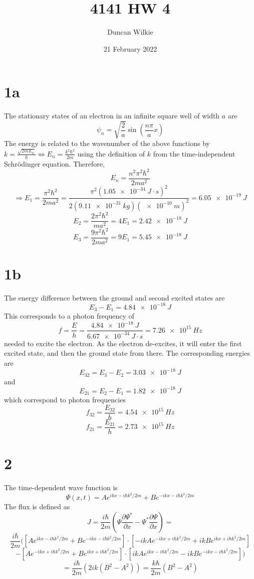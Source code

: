 \documentclass{article}
\title{4141 HW 4}
\author{Duncan Wilkie}
\date{21 February 2022}
\begin{document}
\maketitle

\section*{1a}
The stationary states of an electron in an infinite square well of width $a$ are
\[\psi_{n}=\sqrt{\frac{2}{a}}\sin\left( \frac{n\pi}{a}x \right)\]
The energy is related to the wavenumber of the above functions by $k=\frac{\sqrt{2mE_{n}}}{\hbar}\Leftrightarrow E_{n}=\frac{k^{2}\hbar^{2}}{2m}$ using the definition of $k$ from the time-independent Schr\"odinger equation. Therefore,
\[E_{n}=\frac{n^{2}\pi^{2}\hbar^{2}}{2ma^{2}}\]
\[\Rightarrow E_{1}=\frac{\pi^{2}\hbar^{2}}{2ma^{2}}=\frac{\pi^{2}(\SI{1.05e-34}{J\cdot s})^{2}}{2(\SI{9.11e-31}{kg})(\SI{e-10}{m})^{2}}=\SI{6.05e-19}{J}\]
\[E_{2}=\frac{2\pi^{2}\hbar^{2}}{ma^{2}}=4E_{1}=\SI{2.42e-18}{J}\]
\[E_{3}=\frac{9\pi^{2}\hbar^{2}}{2ma^{2}}=9E_{1}=\SI{5.45e-18}{J}\]

\section*{1b}
The energy difference between the ground and second excited states are
\[E_{3}-E_{1}=\SI{4.84e-18}{J}\]
This corresponds to a photon frequency of
\[f=\frac{E}{h}=\frac{\SI{4.84e-18}{J}}{\SI{6.67e-34}{J\cdot s}}=\SI{7.26e15}{Hz}\]
needed to excite the electron.
As the electron de-excites, it will enter the first excited state, and then the ground state from there. The corresponding energies are
\[E_{3 2}=E_{3}-E_{2}=\SI{3.03e-18}{J}\]
and
\[E_{21}=E_{2}-E_{1}=\SI{1.82e-18}{J}\]
which correspond to photon frequencies
\[f_{32}=\frac{E_{32}}{h}=\SI{4.54e15}{Hz}\]
\[f_{21}=\frac{E_{21}}{h}=\SI{2.73e15}{Hz}\]

\section*{2}
The time-dependent wave function is
\[\Psi(x,t)=Ae^{ikx-i\hbar k^{2}/2m}+Be^{-ikx-i\hbar k^{2}/2m}\]
The flux is defined as
\[J=\frac{i\hbar}{2m}\left( \Psi\frac{\partial \Psi^{*}}{\partial x}-\Psi^{*}\frac{\partial\Psi}{\partial x}\right)=\]\[\frac{i\hbar}{2m}\bigg( \left[  Ae^{ikx-i\hbar k^{2}/2m}+Be^{-ikx-i\hbar k^{2}/2m}\right]\cdot\left[ -ikAe^{-ikx+i\hbar k^{2}/2m}+ikBe^{ikx+i\hbar k^{2}/2m} \right]\]\[ -\left[ Ae^{-ikx+i\hbar k^{2}/2m}+Be^{ikx+i\hbar k^{2}/2m} \right]\cdot\left[ ikAe^{ikx-i\hbar k^{2}/2m}-ikBe^{-ikx-i\hbar k^{2}/2m} \right]\bigg)\]
\[=\frac{i\hbar}{2m}\left( 2ik(B^{2}-A^{2}) \right)=\frac{k\hbar}{2m}(B^{2}-A^{2})\]
\end{document}

